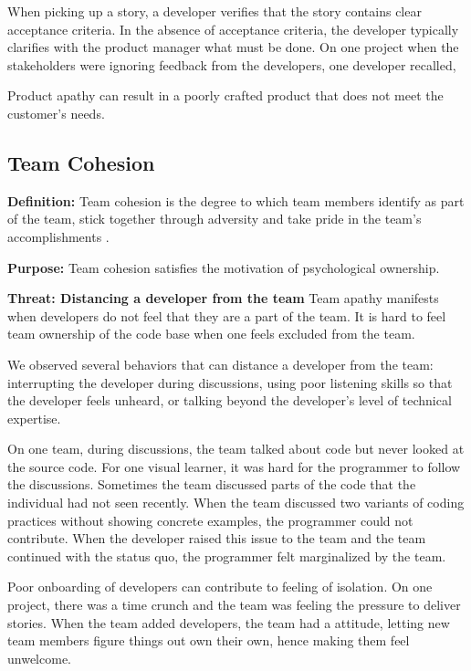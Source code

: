 When picking up a story, a developer verifies that the story contains clear acceptance criteria. In the absence of acceptance criteria, the developer typically clarifies with the product manager what must be done. On one project when the stakeholders were ignoring feedback from the developers, one developer recalled,  

Product apathy can result in a poorly crafted product that does not meet the customer's needs.

\subsection{Team Cohesion}
\textbf{Definition:} Team cohesion is the degree to which team members identify as part of the team, stick together through adversity and take pride in the team's accomplishments \cite{Bollen1990Perceived, Beal2003Cohesion, Whitworth2007Motivation}.

\textbf{Purpose:} Team cohesion satisfies the  motivation of psychological ownership.

\textbf{Threat: Distancing a developer from the team} Team apathy manifests when developers do not feel that they are a part of the team. It is hard to feel team ownership of the code base when one feels excluded from the team.

We observed several behaviors that can distance a developer from the team: interrupting the developer during discussions, using poor listening skills so that the developer feels unheard, or talking beyond the developer's level of technical expertise. 

On one team, during discussions, the team talked about code but never looked at the source code. For one visual learner, it was hard for the programmer to follow the discussions. Sometimes the team discussed parts of the code that the individual had not seen recently. When the team discussed two variants of coding practices without showing concrete examples, the programmer could not contribute. When the developer raised this issue to the team and the team continued with the status quo, the programmer felt marginalized by the team.

Poor onboarding of developers can contribute to feeling of isolation. On one project, there was a time crunch and the team was feeling the pressure to deliver stories. When the team added developers, the team had a  attitude, letting new team members figure things out own their own, hence making them feel unwelcome.

